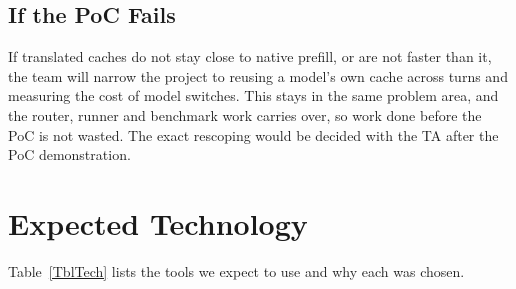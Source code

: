 \documentclass{article}
\begin{document}
\subsection{If the PoC Fails}

If translated caches do not stay close to native prefill, or are not faster
than it, the team will narrow the project to reusing a model's own cache
across turns and measuring the cost of model switches. This stays in the
same problem area, and the router, runner and benchmark work carries over,
so work done before the PoC is not wasted. The exact rescoping would be
decided with the TA after the PoC demonstration.

\section{Expected Technology}

Table~\ref{TblTech} lists the tools we expect to use and why each was
chosen.
\end{document}
